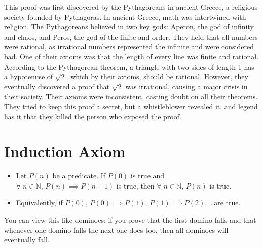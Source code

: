 \documentclass[11pt]{article}
\begin{document}
This proof was first discovered by the Pythagoreans in ancient Greece, a religious society founded by Pythagoras. In ancient Greece, math was intertwined with religion. The Pythagoreans believed in two key gods: Aperon, the god of infinity and chaos, and Peros, the god of the finite and order. They held that all numbers were rational, as irrational numbers represented the infinite and were considered bad. One of their axioms was that the length of every line was finite and rational. According to the Pythagorean theorem, a triangle with two sides of length 1 has a hypotenuse of \( \sqrt{2} \), which by their axioms, should be rational. However, they eventually discovered a proof that \( \sqrt{2} \) was irrational, causing a major crisis in their society. Their axioms were inconsistent, casting doubt on all their theorems. They tried to keep this proof a secret, but a whistleblower revealed it, and legend has it that they killed the person who exposed the proof.

\section{Induction Axiom}
\begin{itemize}
    \item Let \( P(n) \) be a predicate. If \( P(0) \) is true and \( \forall \; n \in \mathbb{N}, \, P(n) \implies P(n+1) \) is true, then \( \forall \; n \in \mathbb{N}, \, P(n) \) is true.
    \item Equivalently, if \( P(0) \), \( P(0) \implies P(1) \), \( P(1) \implies P(2) \), \ldots are true.
\end{itemize}

You can view this like dominoes: if you prove that the first domino falls and that whenever one domino falls the next one does too, then all dominoes will eventually fall.
\vspace{0.5cm}
\end{document}
